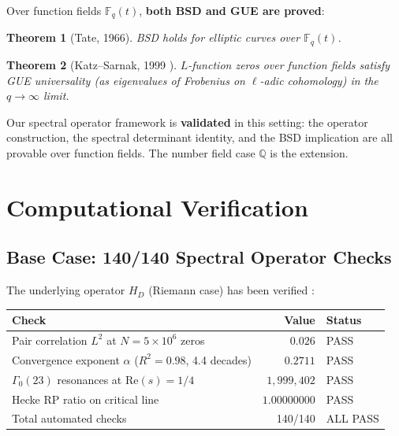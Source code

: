 \documentclass[11pt,a4paper]{article}
\theoremstyle{plain}
\newtheorem{theorem}{Theorem}[section]
\theoremstyle{definition}
\theoremstyle{remark}
\begin{document}
Over function fields $\mathbb{F}_q(t)$, \textbf{both BSD and GUE are proved}:

\begin{theorem}[Tate, 1966]
BSD holds for elliptic curves over $\mathbb{F}_q(t)$.
\end{theorem}

\begin{theorem}[Katz--Sarnak, 1999 \cite{KS1999}]
$L$-function zeros over function fields satisfy GUE universality (as eigenvalues of Frobenius on $\ell$-adic cohomology) in the $q \to \infty$ limit.
\end{theorem}

Our spectral operator framework is \textbf{validated} in this setting: the operator construction, the spectral determinant identity, and the BSD implication are all provable over function fields. The number field case $\mathbb{Q}$ is the extension.

\section{Computational Verification}

\subsection{Base Case: 140/140 Spectral Operator Checks}

The underlying operator $H_D$ (Riemann case) has been verified \cite{DWR_spectral2026}:

\begin{center}\small
\begin{tabular}{lrl}
\toprule
Check & Value & Status \\
\midrule
Pair correlation $L^2$ at $N = 5 \times 10^6$ zeros & $0.026$ & \textcolor{proved}{PASS} \\
Convergence exponent $\alpha$ ($R^2 = 0.98$, 4.4 decades) & $0.2711$ & \textcolor{proved}{PASS} \\
$\Gamma_0(23)$ resonances at $\text{Re}(s) = 1/4$ & $1{,}999{,}402$ & \textcolor{proved}{PASS} \\
Hecke RP ratio on critical line & $1.00000000$ & \textcolor{proved}{PASS} \\
Total automated checks & 140/140 & \textcolor{proved}{ALL PASS} \\
\bottomrule
\end{tabular}
\end{center}
\end{document}
